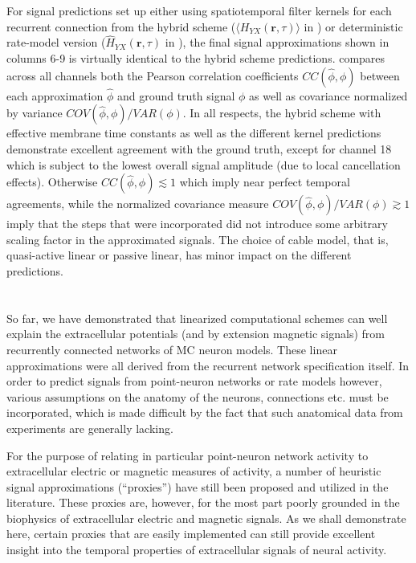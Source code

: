 For signal predictions set up either using spatiotemporal filter kernels for each recurrent connection from the hybrid scheme ($\langle H_{YX}(\mathbf{r}, \tau) \rangle$ in ) or deterministic rate-model version  ($\hat{H}_{YX}(\mathbf{r}, \tau)$ in ), 
the final signal approximations shown in  columns 6-9 is virtually identical to the hybrid scheme predictions. 
 compares across all channels both the Pearson correlation coefficients $CC(\hat{\phi}, \phi)$ between each approximation $\hat{\phi}$ and ground truth signal $\phi$ as well as covariance normalized by variance $COV(\hat{\phi}, \phi)/VAR(\phi)$. 
In all respects, the hybrid scheme with effective membrane time constants as well as the different kernel predictions demonstrate excellent agreement with the ground truth, except for channel 18 which is subject to the lowest overall signal amplitude (due to local cancellation effects). 
Otherwise $CC(\hat{\phi}, \phi) \lesssim 1$ which imply near perfect temporal agreements, 
while the normalized covariance measure $COV(\hat{\phi}, \phi)/VAR(\phi) \gtrsim 1$ imply that the steps that were incorporated did not introduce some arbitrary scaling factor in the approximated signals. 
The choice of cable model, that is, quasi-active linear or passive linear, has minor impact on the different predictions.   


\section{}
\label{sec:Schemes:proxies}

So far, we have demonstrated that linearized computational schemes can well explain the extracellular potentials (and by extension magnetic signals) from recurrently connected networks of MC neuron models. 
These linear approximations were all derived from the recurrent network specification itself. 
In order to predict signals from point-neuron networks or rate models however, 
various assumptions on the anatomy of the neurons, connections etc. must be incorporated, 
which is made difficult by the fact that such anatomical data from experiments are generally lacking. 

For the purpose of relating in particular point-neuron network activity to extracellular electric or magnetic measures of activity,
a number of heuristic signal approximations (``proxies'') have still been proposed and utilized in the literature. 
These proxies are, however, for the most part poorly grounded in the biophysics of extracellular electric and magnetic signals. 
As we shall demonstrate here, certain proxies that are easily implemented can still provide excellent insight into the temporal properties of extracellular signals of neural activity.

